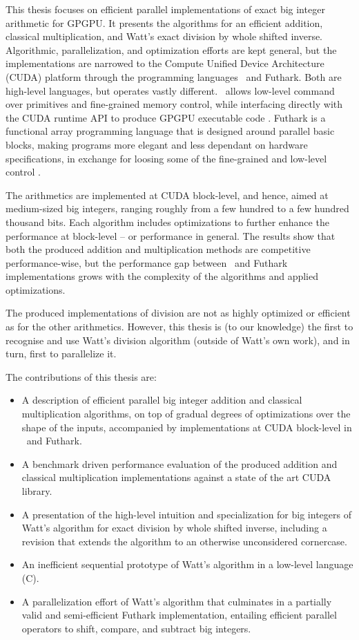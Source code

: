 This thesis focuses on efficient parallel implementations of exact big integer
arithmetic for GPGPU. It presents the algorithms for an efficient addition,
classical multiplication, and Watt's exact division by whole shifted
inverse. Algorithmic, parallelization, and optimization efforts are kept
general, but the implementations are narrowed to the Compute Unified Device
Architecture (CUDA) platform through the programming languages \cpp\ and
Futhark. Both are high-level languages, but operates vastly different. \cpp\
allows low-level command over primitives and fine-grained memory control, while
interfacing directly with the CUDA runtime API to produce GPGPU executable code
\cite{cudaguide, stroustrup}. Futhark is a functional array programming language
that is designed around parallel basic blocks, making programs more elegant and
less dependant on hardware specifications, in exchange for loosing some of the
fine-grained and low-level control \cite{ParallelProgrammingInFuthark,
  Henriksen:2017:FPF:3062341.3062354}.

The arithmetics are implemented at CUDA block-level, and hence, aimed at
medium-sized big integers, ranging roughly from a few hundred to a few hundred
thousand bits. Each algorithm includes optimizations to further enhance the
performance at block-level -- or performance in general. The results show that
both the produced addition and multiplication methods are competitive
performance-wise, but the performance gap between \cpp\ and Futhark
implementations grows with the complexity of the algorithms and applied
optimizations.

The produced implementations of division are not as highly optimized or
efficient as for the other arithmetics. However, this thesis is (to our
knowledge) the first to recognise and use Watt's division algorithm (outside of
Watt's own work), and in turn, first to parallelize it.

The contributions of this thesis are:
\begin{itemize}
\item A description of efficient parallel big integer addition and classical
  multiplication algorithms, on top of gradual degrees of optimizations over the
  shape of the inputs, accompanied by implementations at CUDA block-level in
  \cpp\ and Futhark.
\item A benchmark driven performance evaluation of the produced addition and
  classical multiplication implementations against a state of the art CUDA
  library.
\item A presentation of the high-level intuition and specialization for big
  integers of Watt's algorithm for exact division by whole shifted inverse,
  including a revision that extends the algorithm to an otherwise unconsidered
  cornercase.
\item An inefficient sequential prototype of Watt's algorithm in a low-level
  language (C).
\item A parallelization effort of Watt's algorithm that culminates in a
  partially valid and semi-efficient Futhark implementation, entailing efficient
  parallel operators to shift, compare, and subtract big integers.
\end{itemize}
\bigskip

